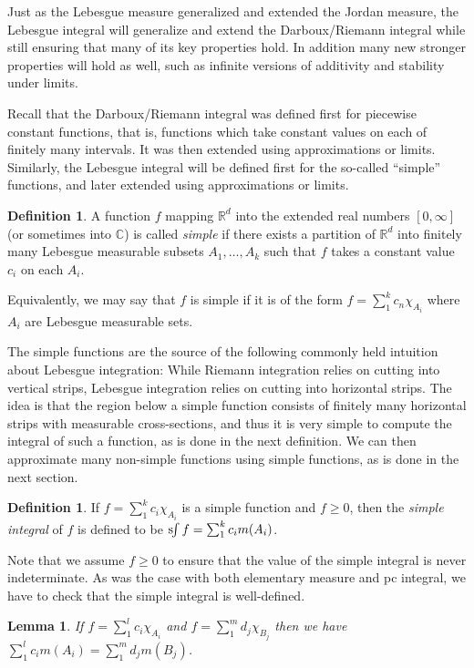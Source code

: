 \documentclass[10pt,oneside]{amsbook}
\newcommand{\RR}{{\mathbb R}}
\newcommand{\CC}{{\mathbb C}}
\newcommand{\sint}{\text{s}\kern-3pt\int}
\theoremstyle{definition}
\theoremstyle{plain}
\newtheorem{lem}[thm]{Lemma}
\theoremstyle{definition}
\newtheorem{defn}[thm]{Definition}
\theoremstyle{remark}
\numberwithin{equation}{section}
\numberwithin{figure}{section}
\begin{document}
Just as the Lebesgue measure generalized and extended the Jordan measure, the Lebesgue integral will generalize and extend the Darboux/Riemann integral while still ensuring that many of its key properties hold. In addition many new stronger properties will hold as well, such as infinite versions of additivity and stability under limits.

Recall that the Darboux/Riemann integral was defined first for piecewise constant functions, that is, functions which take constant values on each of finitely many intervals. It was then extended using approximations or limits. Similarly, the Lebesgue integral will be defined first for the so-called ``simple'' functions, and later extended using approximations or limits.

\begin{defn}
  A function $f$ mapping $\RR^d$ into the extended real numbers $[0,\infty]$ (or sometimes into $\CC$) is called \emph{simple} if there exists a partition of $\RR^d$ into finitely many Lebesgue measurable subsets $A_1,\ldots,A_k$ such that $f$ takes a constant value $c_i$ on each $A_i$.
\end{defn}

Equivalently, we may say that $f$ is simple if it is of the form $f=\sum_1^kc_n\chi_{A_i}$ where $A_i$ are Lebesgue measurable sets.

The simple functions are the source of the following commonly held intuition about Lebesgue integration: While Riemann integration relies on cutting into vertical strips, Lebesgue integration relies on cutting into horizontal strips. The idea is that the region below a simple function consists of finitely many horizontal strips with measurable cross-sections, and thus it is very simple to compute the integral of such a function, as is done in the next definition. We can then approximate many non-simple functions using simple functions, as is done in the next section.

\begin{defn}
  If $f=\sum_1^kc_i\chi_{A_i}$ is a simple function and $f\geq0$, then the \emph{simple integral} of $f$ is defined to be $\sint f=\sum_1^kc_im(A_i)$.
\end{defn}

Note that we assume $f\geq0$ to ensure that the value of the simple integral is never indeterminate. As was the case with both elementary measure and pc integral, we have to check that the simple integral is well-defined.

\begin{lem}
  If $f=\sum_1^lc_i\chi_{A_i}$ and $f=\sum_1^md_j\chi_{B_j}$ then we have $\sum_1^l c_i m(A_i)=\sum_1^m d_j m(B_j)$.
\end{lem}
\end{document}
